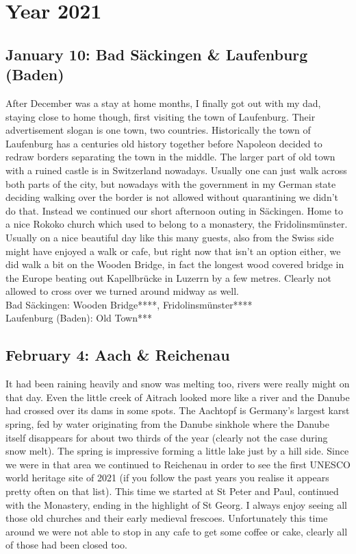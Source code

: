 \chapter{Year 2021}
\label{2021}

\section{January 10: Bad S\"ackingen \& Laufenburg (Baden)}
\label{2021:BadSaeckingen}

After December was a stay at home months, I finally got out with my dad, staying close to home though, first visiting the town of Laufenburg. Their advertisement slogan is one town, two countries. Historically the town of Laufenburg has a centuries old history together before Napoleon decided to redraw borders separating the town in the middle. The larger part of old town with a ruined castle is in Switzerland nowadays. Usually one can just walk across both parts of the city, but nowadays with the government in my German state deciding walking over the border is not allowed without quarantining we didn't do that. Instead we continued our short afternoon outing in S\"ackingen. Home to a nice Rokoko church which used to belong to a monastery, the Fridolinsm\"unster. Usually on a nice beautiful day like this many guests, also from the Swiss side might have enjoyed a walk or cafe, but right now that isn't an option either, we did walk a bit on the Wooden Bridge, in fact the longest wood covered bridge in the Europe beating out Kapellbr\"ucke in Luzerrn by a few metres. Clearly not allowed to cross over we turned around midway as well.\\

Bad S\"ackingen: Wooden Bridge****, Fridolinsm\"unster****\\
Laufenburg (Baden): Old Town***\\

\section{February 4: Aach \& Reichenau}
\label{2021:AachReichenau}

It had been raining heavily and snow was melting too, rivers were really might on that day. Even the little creek of Aitrach looked more like a river and the Danube had crossed over its dams in some spots. The Aachtopf is Germany's largest karst spring, fed by water originating from the Danube sinkhole where the Danube itself disappears for about two thirds of the year (clearly not the case during snow melt). The spring is impressive forming a little lake just by a hill side. Since we were in that area we continued to Reichenau in order to see the first UNESCO world heritage site of 2021 (if you follow the past years you realise it appears pretty often on that list). This time we started at St Peter and Paul, continued with the Monastery, ending in the highlight of St Georg. I always enjoy seeing all those old churches and their early medieval frescoes. Unfortunately this time around we were not able to stop in any cafe to get some coffee or cake, clearly all of those had been closed too.\\

